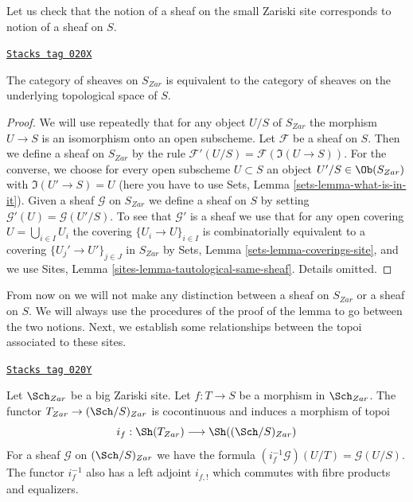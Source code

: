 Let us check that the notion of a sheaf on the small Zariski site
corresponds to notion of a sheaf on $S$.

\begin{lemma}
\label{topologies-lemma-Zariski-usual}
\href{https://stacks.math.columbia.edu/tag/020X}{\texttt{Stacks tag 020X}}

The category of sheaves on $S_{Zar}$ is equivalent to the
category of sheaves on the underlying topological space of $S$.
\end{lemma}

\begin{proof}
We will use repeatedly that for any object
$U/S$ of $S_{Zar}$ the morphism $U \to S$ is an isomorphism
onto an open subscheme.
Let $\mathcal{F}$ be a sheaf on $S$. Then we define a sheaf
on $S_{Zar}$ by the rule $\mathcal{F}'(U/S) = \mathcal{F}(\Im(U \to S))$.
For the converse, we choose for every open subscheme $U \subset S$ an object
$U'/S \in \Ob(S_{Zar})$ with $\Im(U' \to S) = U$
(here you have to use Sets, Lemma \ref{sets-lemma-what-is-in-it}).
Given a sheaf $\mathcal{G}$ on $S_{Zar}$ we define a sheaf on $S$ by setting
$\mathcal{G}'(U) = \mathcal{G}(U'/S)$. To see that $\mathcal{G}'$ is
a sheaf we use that for any open covering $U = \bigcup_{i \in I} U_i$
the covering $\{U_i \to U\}_{i \in I}$
is combinatorially equivalent to a covering $\{U_j' \to U'\}_{j \in J}$
in $S_{Zar}$ by Sets, Lemma \ref{sets-lemma-coverings-site},
and we use Sites, Lemma \ref{sites-lemma-tautological-same-sheaf}.
Details omitted.
\end{proof}

From now on we will not make any distinction between a sheaf on
$S_{Zar}$ or a sheaf on $S$. We will always use the procedures
of the proof of the lemma to go between the two notions.
Next, we establish some relationships between the topoi
associated to these sites.

\begin{lemma}[Put in T]
\label{topologies-lemma-put-in-T}
\href{https://stacks.math.columbia.edu/tag/020Y}{\texttt{Stacks tag 020Y}}

Let $\Sch_{Zar}$ be a big Zariski site.
Let $f : T \to S$ be a morphism in $\Sch_{Zar}$.
The functor $T_{Zar} \to (\Sch/S)_{Zar}$
is cocontinuous and induces a morphism of topoi
$$
i_f :
\Sh(T_{Zar})
\longrightarrow
\Sh((\Sch/S)_{Zar})
$$
For a sheaf $\mathcal{G}$ on $(\Sch/S)_{Zar}$
we have the formula $(i_f^{-1}\mathcal{G})(U/T) = \mathcal{G}(U/S)$.
The functor $i_f^{-1}$ also has a left adjoint $i_{f, !}$ which commutes
with fibre products and equalizers.
\end{lemma}

